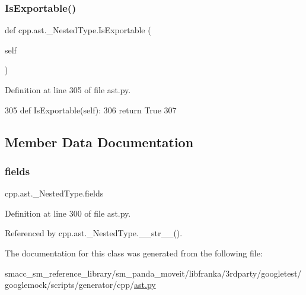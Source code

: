 \subsubsection{\texorpdfstring{Is\+Exportable()}{IsExportable()}}
{\footnotesize\ttfamily def cpp.\+ast.\+\_\+\+Nested\+Type.\+Is\+Exportable (\begin{DoxyParamCaption}\item[{}]{self }\end{DoxyParamCaption})}



Definition at line 305 of file ast.\+py.


\begin{DoxyCode}
305     \textcolor{keyword}{def }IsExportable(self):
306         \textcolor{keywordflow}{return} \textcolor{keyword}{True}
307 
\end{DoxyCode}


\subsection{Member Data Documentation}
\mbox{\label{classcpp_1_1ast_1_1__NestedType_aed69c37a409b4d26e6cfde2de3185d86}} 
\subsubsection{\texorpdfstring{fields}{fields}}
{\footnotesize\ttfamily cpp.\+ast.\+\_\+\+Nested\+Type.\+fields}



Definition at line 300 of file ast.\+py.



Referenced by cpp.\+ast.\+\_\+\+Nested\+Type.\+\_\+\+\_\+str\+\_\+\+\_\+().



The documentation for this class was generated from the following file\+:\begin{DoxyCompactItemize}
\item 
smacc\+\_\+sm\+\_\+reference\+\_\+library/sm\+\_\+panda\+\_\+moveit/libfranka/3rdparty/googletest/googlemock/scripts/generator/cpp/\hyperlink{ast_8py}{ast.\+py}\end{DoxyCompactItemize}
